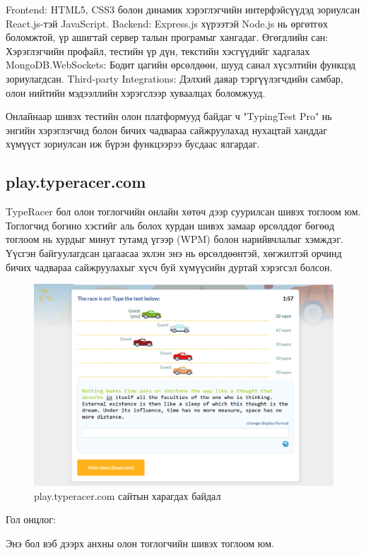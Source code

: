 Frontend: HTML5, CSS3 болон динамик хэрэглэгчийн интерфэйсүүдэд зориулсан React.js-тэй JavaScript.
Backend: Express.js хүрээтэй Node.js нь өргөтгөх боломжтой, үр ашигтай сервер талын програмыг хангадаг.
Өгөгдлийн сан: Хэрэглэгчийн профайл, тестийн үр дүн, текстийн хэсгүүдийг хадгалах MongoDB.WebSockets: Бодит цагийн өрсөлдөөн, шууд санал хүсэлтийн функцэд зориулагдсан.
Third-party Integrations: Дэлхий даяар тэргүүлэгчдийн самбар, олон нийтийн мэдээллийн хэрэгслээр хуваалцах боломжууд.

Онлайнаар шивэх тестийн олон платформууд байдаг ч "TypingTest Pro" нь энгийн хэрэглэгчид болон бичих чадвараа сайжруулахад нухацтай ханддаг хүмүүст зориулсан иж бүрэн функцээрээ бусдаас ялгардаг.

\subsection{play.typeracer.com}

TypeRacer бол олон тоглогчийн онлайн хөтөч дээр суурилсан шивэх тоглоом юм. Тоглогчид богино хэсгийг аль болох хурдан шивэх замаар өрсөлддөг бөгөөд тоглоом нь хурдыг минут тутамд үгээр (WPM) болон нарийвчлалыг хэмждэг. Үүсгэн байгуулагдсан цагаасаа эхлэн энэ нь өрсөлдөөнтэй, хөгжилтэй орчинд бичих чадвараа сайжруулахыг хүсч буй хүмүүсийн дуртай хэрэгсэл болсон.

\begin{figure}[h]
	\centering
	\includegraphics[width=15cm]{images/TypeRacer.png}
	\caption{play.typeracer.com сайтын харагдах байдал}
	\label{fig:linktree}
\end{figure}

Гол онцлог:

Энэ бол вэб дээрх анхны олон тоглогчийн шивэх тоглоом юм.

